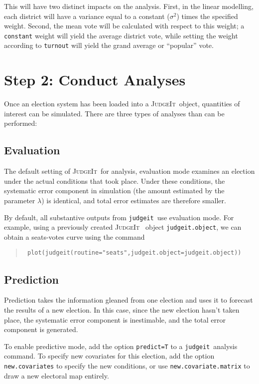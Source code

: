 \documentclass[oneside,letterpaper,titlepage]{article}
\newcommand{\JudgeIt}{\textsc{JudgeIt}\ }
\newcommand{\jud}{\texttt{judgeit}\ }
\begin{document}
This will have two distinct impacts on the analysis. First, in the linear modelling, each district will have a variance equal to a constant ($\sigma^2$) times the specified weight. Second, the mean vote will be calculated with respect to this weight; a \texttt{constant} weight will yield the average district vote, while setting the weight according to \texttt{turnout} will yield the grand average or ``popular'' vote.

\section{Step 2: Conduct Analyses}

Once an election system has been loaded into a \JudgeIt object,
quantities of interest can be simulated. There are three types of
analyses than can be performed:

\subsection{Evaluation}

The default setting of \JudgeIt for analysis, evaluation mode
examines an election under the actual conditions that took place.
Under these conditions, the systematic error component in simulation
(the amount estimated by the parameter $\lambda$) is identical, and
total error estimates are therefore smaller.

By default, all substantive outputs from \jud use
evaluation mode. For example, using a previously created \JudgeIt
object \texttt{judgeit.object}, we can obtain a seats-votes curve
using the command

\begin{quote} \texttt{
plot(judgeit(routine="seats",judgeit.object=judgeit.object))}
\end{quote}

\subsection{Prediction}

Prediction takes the information gleaned from one election and uses
it to forecast the results of a new election. In this case, since the new election hasn't taken place, the systematic error component is inestimable, and the total error component is generated.

To enable predictive mode, add the option \texttt{predict=T} to a
\jud analysis command. To specify new covariates for
this election, add the option \texttt{new.covariates} to specify the
new conditions, or use \texttt{new.covariate.matrix} to draw a new electoral map entirely.
\end{document}
